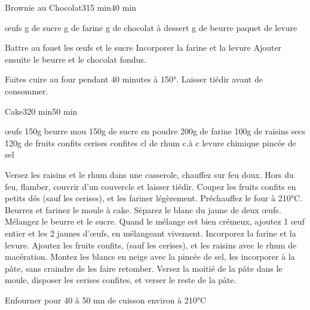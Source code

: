 \begin{recette}{Brownie au Chocolat}{3}{15 min}{40 min}
\begin{ingredients}
 œufs
 g de sucre
 g de farine
 g de chocolat à dessert
 g de beurre
 paquet de levure
\end{ingredients}

\begin{preparation}
\etape Battre au fouet les œufs et le sucre
\etape Incorporer la farine et la levure
\etape Ajouter ensuite le beurre et le chocolat fondus.
\end{preparation}

\begin{cuisson}
Faites cuire au four pendant 40 minutes à 150°.
Laisser tiédir avant de consommer. 
\end{cuisson}
\end{recette}

\begin{recette}{Cake}{3}{20 min}{50 min}
\begin{ingredients}
 œufs
\ingredient 150g beurre mou
\ingredient 150g de sucre en poudre
\ingredient 200g de farine
\ingredient 100g de raisins secs
\ingredient 120g de fruits confits
\ingredient cerises confites
 cl de rhum
 c.à c levure chimique
 pincée de sel
\end{ingredients}

\begin{preparation}
\etape Versez les raisins et le rhum dans une casserole, chauffez sur feu doux. Hors du feu, flamber, couvrir d'un couvercle et laisser tiédir.
\etape Coupez les fruits confits en petits dés (sauf les cerises), et les fariner légèrement.
\etape Préchauffez le four à 210°C. Beurrez et farinez le moule à cake.
\etape Séparez le blanc du jaune de deux œufs.
\etape Mélangez le beurre et le sucre. Quand le mélange est bien crémeux, ajoutez 1 œuf entier et les 2 jaunes d'œufs, en mélangeant vivement.
\etape Incorporez la farine et la levure.
\etape Ajoutez les fruits confits, (sauf les cerises), et les raisins avec le rhum de macération.
\etape Montez les blancs en neige avec la pincée de sel, les incorporer à la pâte, sans craindre de les faire retomber.
\etape Versez la moitié de la pâte dans le moule, disposer les cerises confites, et verser le reste de la pâte.

\end{preparation}

\begin{cuisson}
Enfourner pour 40 à 50 mn de cuisson environ à 210°C
\end{cuisson}
\end{recette}

